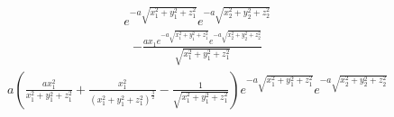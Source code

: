 \begin{align}
e^{- a \sqrt{x_{1}^{2} + y_{1}^{2} + z_{1}^{2}}} e^{- a \sqrt{x_{2}^{2} + y_{2}^{2} + z_{2}^{2}}}
\end{align}
\begin{align}
- \frac{a x_{1} e^{- a \sqrt{x_{1}^{2} + y_{1}^{2} + z_{1}^{2}}} e^{- a \sqrt{x_{2}^{2} + y_{2}^{2} + z_{2}^{2}}}}{\sqrt{x_{1}^{2} + y_{1}^{2} + z_{1}^{2}}}
\end{align}
\begin{align}
a \left(\frac{a x_{1}^{2}}{x_{1}^{2} + y_{1}^{2} + z_{1}^{2}} + \frac{x_{1}^{2}}{\left(x_{1}^{2} + y_{1}^{2} + z_{1}^{2}\right)^{\frac{3}{2}}} - \frac{1}{\sqrt{x_{1}^{2} + y_{1}^{2} + z_{1}^{2}}}\right) e^{- a \sqrt{x_{1}^{2} + y_{1}^{2} + z_{1}^{2}}} e^{- a \sqrt{x_{2}^{2} + y_{2}^{2} + z_{2}^{2}}}
\end{align}